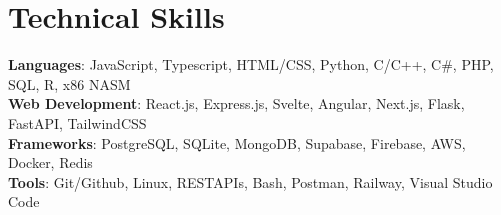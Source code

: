 \documentclass[letterpaper,11pt]{article}
\begin{document}
\section{Technical Skills}
 \begin{itemize}[leftmargin=0.1in, label={}]
    \small{\item{
     \textbf{Languages}{: JavaScript, Typescript, HTML/CSS, Python, C/C++, C\#, PHP, SQL, R, x86 NASM} \\
     \textbf{Web Development}{: React.js, Express.js, Svelte, Angular, Next.js, Flask, FastAPI, TailwindCSS} \\
     \textbf{Frameworks}{: PostgreSQL, SQLite, MongoDB, Supabase, Firebase, AWS, Docker, Redis } \\
     \textbf{Tools}{: Git/Github, Linux, RESTAPIs, Bash, Postman, Railway, Visual Studio Code}
    }}
 \end{itemize}
 
        


\end{document}
